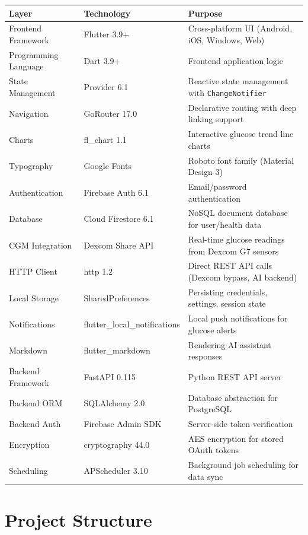 \documentclass[12pt,a4paper]{article}
\begin{document}
\begin{longtable}{p{4cm} p{3.5cm} p{7cm}}
\toprule
\textbf{Layer} & \textbf{Technology} & \textbf{Purpose} \\
\midrule
\endhead
Frontend Framework & Flutter 3.9+ & Cross-platform UI (Android, iOS, Windows, Web) \\
Programming Language & Dart 3.9+ & Frontend application logic \\
State Management & Provider 6.1 & Reactive state management with \texttt{ChangeNotifier} \\
Navigation & GoRouter 17.0 & Declarative routing with deep linking support \\
Charts & fl\_chart 1.1 & Interactive glucose trend line charts \\
Typography & Google Fonts & Roboto font family (Material Design 3) \\
Authentication & Firebase Auth 6.1 & Email/password authentication \\
Database & Cloud Firestore 6.1 & NoSQL document database for user/health data \\
CGM Integration & Dexcom Share API & Real-time glucose readings from Dexcom G7 sensors \\
HTTP Client & http 1.2 & Direct REST API calls (Dexcom bypass, AI backend) \\
Local Storage & SharedPreferences & Persisting credentials, settings, session state \\
Notifications & flutter\_local\_notifications & Local push notifications for glucose alerts \\
Markdown & flutter\_markdown & Rendering AI assistant responses \\
Backend Framework & FastAPI 0.115 & Python REST API server \\
Backend ORM & SQLAlchemy 2.0 & Database abstraction for PostgreSQL \\
Backend Auth & Firebase Admin SDK & Server-side token verification \\
Encryption & cryptography 44.0 & AES encryption for stored OAuth tokens \\
Scheduling & APScheduler 3.10 & Background job scheduling for data sync \\
\bottomrule
\end{longtable}

\section{Project Structure}
\end{document}
